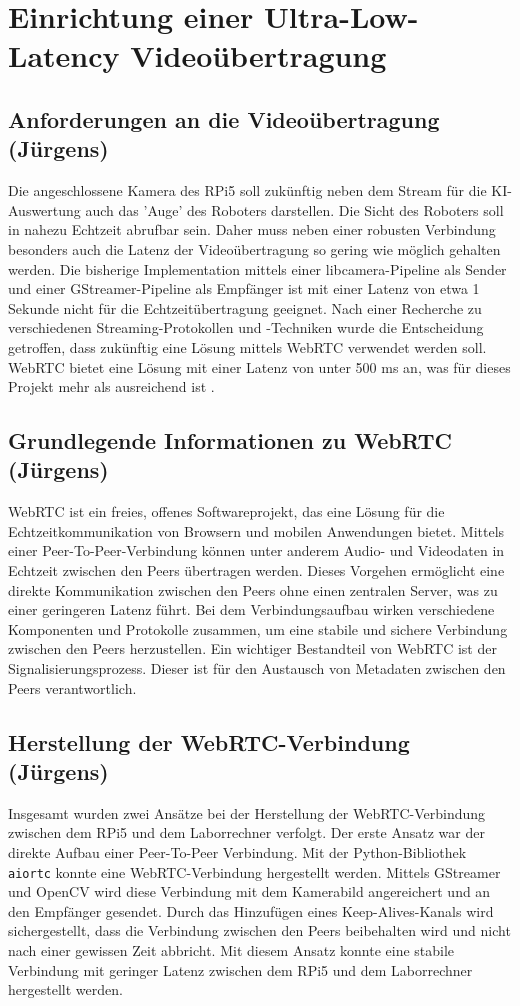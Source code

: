 \chapter{Einrichtung einer Ultra-Low-Latency Videoübertragung \label{sec:webrtc}}
\section{Anforderungen an die Videoübertragung (Jürgens)}
Die angeschlossene Kamera des RPi5 soll zukünftig neben dem Stream für die KI-Auswertung auch das 'Auge' des Roboters darstellen. Die Sicht des Roboters soll in nahezu Echtzeit abrufbar sein. Daher muss neben einer robusten Verbindung besonders auch die Latenz der Videoübertragung so gering wie möglich gehalten werden. Die bisherige Implementation mittels einer libcamera-Pipeline als Sender und einer GStreamer-Pipeline als Empfänger ist mit einer Latenz von etwa 1 Sekunde nicht für die Echtzeitübertragung geeignet. Nach einer Recherche zu verschiedenen Streaming-Protokollen und -Techniken wurde die Entscheidung getroffen, dass zukünftig eine Lösung mittels WebRTC verwendet werden soll. WebRTC bietet eine Lösung mit einer Latenz von unter 500 ms an, was für dieses Projekt mehr als ausreichend ist \cite{WebRTCLatency}.

\section{Grundlegende Informationen zu WebRTC (Jürgens)}
WebRTC ist ein freies, offenes Softwareprojekt, das eine Lösung für die Echtzeitkommunikation von Browsern und mobilen Anwendungen bietet. Mittels einer Peer-To-Peer-Verbindung können unter anderem Audio- und Videodaten in Echtzeit zwischen den Peers übertragen werden. Dieses Vorgehen ermöglicht eine direkte Kommunikation zwischen den Peers ohne einen zentralen Server, was zu einer geringeren Latenz führt.
Bei dem Verbindungsaufbau wirken verschiedene Komponenten und Protokolle zusammen, um eine stabile und sichere Verbindung zwischen den Peers herzustellen. Ein wichtiger Bestandteil von WebRTC ist der Signalisierungsprozess. Dieser ist für den Austausch von Metadaten zwischen den Peers verantwortlich. \cite{WebRTCBasics}

\section{Herstellung der WebRTC-Verbindung (Jürgens)}
Insgesamt wurden zwei Ansätze bei der Herstellung der WebRTC-Verbindung zwischen dem RPi5 und dem Laborrechner verfolgt. Der erste Ansatz war der direkte Aufbau einer Peer-To-Peer Verbindung.
Mit der Python-Bibliothek \texttt{aiortc} konnte eine WebRTC-Verbindung hergestellt werden. Mittels GStreamer und OpenCV wird diese Verbindung mit dem Kamerabild angereichert und an den Empfänger gesendet. Durch das Hinzufügen eines Keep-Alives-Kanals wird sichergestellt, dass die Verbindung zwischen den Peers beibehalten wird und nicht nach einer gewissen Zeit abbricht. Mit diesem Ansatz konnte eine stabile Verbindung mit geringer Latenz zwischen dem RPi5 und dem Laborrechner hergestellt werden.

